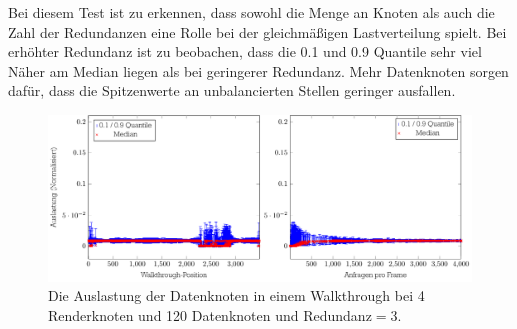 Bei diesem Test ist zu erkennen, dass sowohl die Menge an Knoten als auch die Zahl der Redundanzen eine Rolle bei der gleichmäßigen Lastverteilung spielt. Bei erhöhter Redundanz ist zu beobachen, dass die 0.1 und 0.9 Quantile sehr viel Näher am Median liegen als bei geringerer Redundanz. Mehr Datenknoten sorgen dafür, dass die Spitzenwerte an unbalancierten Stellen geringer ausfallen.

\begin{figure}
\centering
\includegraphics[scale=0.75]{images/diag_cCol_red3_render4_data120_2x.pdf}
  \caption{\label{fig:eval:cCol9}Die Auslastung der Datenknoten in einem Walkthrough bei 4 Renderknoten und 120 Datenknoten und Redundanz$=$3.}
\end{figure}
